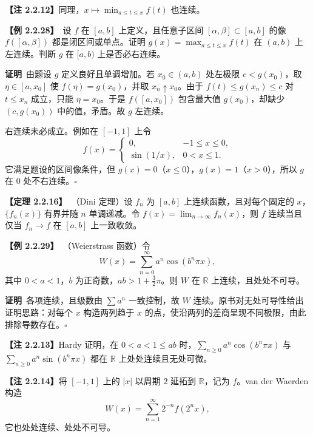 \documentclass[UTF8,a4paper,11pt]{ctexart}
\newcommand{\ex}[1]{\par\medskip\noindent\textbf{【例 #1】}\ }
\newcommand{\thm}[1]{\par\medskip\noindent\textbf{【定理 #1】}\ }
\newcommand{\pf}{\par\noindent\textbf{证明}\ }
\begin{document}
\noindent\textbf{【注 2.2.12】}同理，$x\mapsto\min_{a\le t\le x}f(t)$ 也连续。

\ex{2.2.28}设 $f$ 在 $[a,b]$ 上定义，且任意子区间 $[\alpha,\beta]\subset[a,b]$ 的像 $f([\alpha,\beta])$ 都是闭区间或单点。证明 $g(x)=\max_{a\le t\le x}f(t)$ 在 $(a,b)$ 上左连续。判断 $g$ 在 $[a,b)$ 上是否必右连续。
\pf 由题设 $g$ 定义良好且单调增加。若 $x_0\in(a,b)$ 处左极限 $c<g(x_0)$，取 $\eta\in[a,x_0]$ 使 $f(\eta)=g(x_0)$，并取 $x_n\uparrow x_0$。由于 $f(t)\le g(x_n)\le c$ 对 $t\le x_n$ 成立，只能 $\eta=x_0$。于是 $f([a,x_0])$ 包含最大值 $g(x_0)$，却缺少 $(c,g(x_0))$ 中的值，矛盾。故 $g$ 左连续。

右连续未必成立。例如在 $[-1,1]$ 上令
\[
f(x)=\begin{cases}0,&-1\le x\le0,\\ \sin(1/x),&0<x\le1.\end{cases}
\]
它满足题设的区间像条件，但 $g(x)=0$（$x\le0$），$g(x)=1$（$x>0$），所以 $g$ 在 $0$ 处不右连续。\hfill$\square$

\thm{2.2.16}（Dini 定理）设 $f_n$ 为 $[a,b]$ 上连续函数，且对每个固定的 $x$，$\{f_n(x)\}$ 有界并随 $n$ 单调递减。令 $f(x)=\lim_{n\to\infty}f_n(x)$，则 $f$ 连续当且仅当 $f_n\to f$ 在 $[a,b]$ 上一致收敛。

\ex{2.2.29}（Weierstrass 函数）令
\[
W(x)=\sum_{n=0}^{\infty}a^n\cos(b^n\pi x),
\]
其中 $0<a<1$，$b$ 为正奇数，$ab>1+\tfrac32\pi$。则 $W$ 在 $\mathbb R$ 上连续，且处处不可导。
\pf 各项连续，且级数由 $\sum a^n$ 一致控制，故 $W$ 连续。原书对无处可导性给出证明思路：对每个 $x$ 构造两列趋于 $x$ 的点，使沿两列的差商呈现不同极限，由此排除导数存在。\hfill$\square$

\noindent\textbf{【注 2.2.13】}Hardy 证明，在 $0<a<1\le ab$ 时，$\sum_{n\ge0}a^n\cos(b^n\pi x)$ 与 $\sum_{n\ge0}a^n\sin(b^n\pi x)$ 都在 $\mathbb R$ 上处处连续且无处可微。

\noindent\textbf{【注 2.2.14】}将 $[-1,1]$ 上的 $|x|$ 以周期 $2$ 延拓到 $\mathbb R$，记为 $f$。van der Waerden 构造
\[
W(x)=\sum_{n=1}^{\infty}2^{-n}f(2^nx),
\]
它也处处连续、处处不可导。
\end{document}
